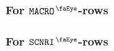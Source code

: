 \subsubsection{For $\isMxpMacro$-rows}         \label{mxp: constraints: heartbeat}        
\subsubsection{For $\isMxpScenario$-rows}      \label{mxp: constraints: heartbeat}        

